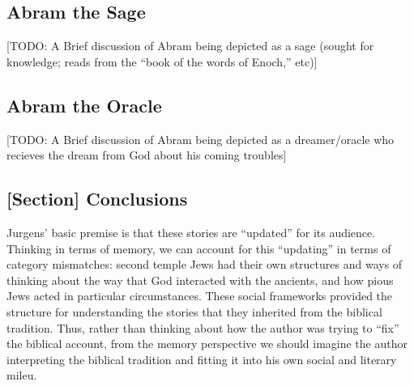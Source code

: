 \subsection{Abram the Sage}


[TODO: A Brief discussion of Abram being depicted as a sage (sought for knowledge; reads from the ``book of the words of Enoch,'' etc)]

\subsection{Abram the Oracle}

[TODO: A Brief discussion of Abram being depicted as a dreamer/oracle who recieves the dream from God about his coming troubles]

\subsection{[Section] Conclusions}

Jurgens' basic premise is that these stories are ``updated'' for its audience. Thinking in terms of memory, we can account for this ``updating'' in terms of category mismatches: second temple Jews had their own structures and ways of thinking about the way that God interacted with the ancients, and how pious Jews acted in particular circumstances. These social frameworks provided the structure for understanding the stories that they inherited from the biblical tradition. Thus, rather than thinking about how the author was trying to ``fix'' the biblical account, from the memory perspective we should imagine the author interpreting the biblical tradition and fitting it into his own social and literary mileu.